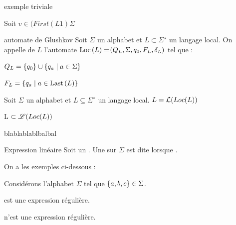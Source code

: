 \documentclass[a4paper,french,bookmarks]{book}
\begin{document}
    \begin{example}
            exemple triviale 
            
            
            
            Soit $v \in (First(L1)\Sigma $ %
            
            
    \end{example}
    
    \begin{definition}{automate de Glushkov}{}
        Soit $\Sigma$ un alphabet et $L \subset \Sigma^\star$ un langage local. On appelle  de $L$ l'automate $\Loc{L} = \p{Q_L, \Sigma, q_0, F_L, \delta_L}$ tel que :
        \begin{enumerate}
            \itast $Q_L = \left\{q_0\right\} \cup \left\{q_a \;\middle\vert\; a \in \Sigma\right\}$
            
            \itast $F_L = \ens{q_a \enstq a \in \Last{L}} $
        \end{enumerate}
        
        
    \end{definition}
    
    \begin{theorem}
        Soit $\Sigma$ un alphabet et $L \subseteq \Sigma^\star$ un langage local. $L = \mathcal{L}(Loc(L))$
    \end{theorem}
    \begin{nproof}
        L $\subset \mathscr{L}(Loc(L))$
        \begin{enumerate}
            \itt \Huge{blablablablbalbal}
        \end{enumerate}
    \end{nproof}
    
    \begin{definition}{Expression linéaire}{}
        Soit \hg{$\Sigma$} un . Une  sur $\Sigma$ est dite  lorsque .
    \end{definition}
    
    On a les exemples ci-dessous :
    \begin{example}{}{}
        Considérons l'alphabet $\Sigma$ tel que $\left\{a, b, c\right\} \in \Sigma$.
        \begin{enumerate}
            \itt {} est une expression régulière.
            
            \itt {} n'est  une expression régulière.
        \end{enumerate}
    \end{example}
    
\end{document}
